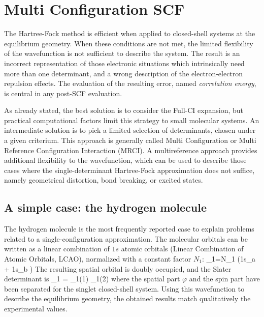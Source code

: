 \section{Multi Configuration SCF}

The Hartree-Fock method is efficient when applied to closed-shell systems at
the equilibrium geometry. When these conditions are not met, the limited
flexibility of the wavefunction is not sufficient to describe the system.
The result is an incorrect representation of those electronic situations
which intrinsically need more than one determinant, and a wrong description
of the electron-electron repulsion effects.  The evaluation of the resulting
error, named \textit{correlation energy}, is central in any post-SCF
evaluation.

As already stated, the best solution is to consider the Full-CI expansion,
but practical computational factors limit this strategy to small molecular
systems. An intermediate solution is to pick a limited selection of
determinants, chosen under a given criterium. This approach
is generally called Multi Configuration or Multi Reference Configuration
Interaction (MRCI). 
A multireference approach provides additional flexibility to the
wavefunction, which can be used to describe those cases where the 
single-determinant Hartree-Fock approximation does not suffice, namely
geometrical distortion, bond breaking, or excited states.

\subsection*{A simple case: the hydrogen molecule}

The hydrogen molecule is the most frequently reported case to explain
problems related to a single-configuration approximation.
The molecular orbitals can be written as a linear combination of
$1s$ atomic orbitals (Linear Combination of Atomic Orbitals, LCAO),
normalized with a constant factor $N_1$:
\beq
\varphi_1=N_1 \left(1s_a + 1s_b \right)
\eeq
The resulting spatial orbital is doubly occupied, and the Slater determinant
is
\beq
\Phi_1 = \varphi_1(1) \varphi_1(2) 
\eeq
where the spatial part $\varphi$ and the spin part have been separated for
the singlet closed-shell system.  Using this wavefunction to describe the
equilibrium geometry, the obtained results match qualitatively the
experimental values.

